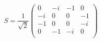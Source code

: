 \documentclass[11pt,a4paper]{report}
\begin{document}
\begin{equation}
S = \frac{1}{\sqrt{2}}
\left(
\begin{array}{cccc}
0 & -i & -1 & 0 \\
-i & 0 & 0 & -1 \\
-1 & 0 & 0 & -i \\
0 & -1 & -i & 0 \\
\end{array}
\right)
\end{equation}
\end{document}

